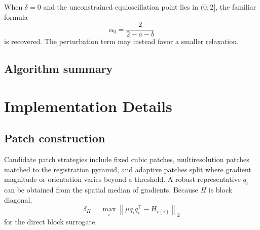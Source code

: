 \documentclass[11pt]{article}
\theoremstyle{definition}
\newcommand{\norm}[1]{\left\lVert #1\right\rVert}
\begin{document}
When $\delta=0$ and the unconstrained equioscillation point lies in $(0,2]$, the familiar formula
\[
\alpha_0=\frac{2}{2-a-b}
\]
is recovered. The perturbation term may instead favor a smaller relaxation.

\subsection{Algorithm summary}
\begin{center}
\end{center}

\section{Implementation Details}
\subsection{Patch construction}
Candidate patch strategies include fixed cubic patches, multiresolution patches matched to the registration pyramid, and adaptive patches split where gradient magnitude or orientation varies beyond a threshold. A robust representative $\bar q_r$ can be obtained from the spatial median of gradients. Because $H$ is block diagonal,
\[
\delta_H
=\max_i\norm{\mu q_iq_i^\top-H_{r(i)}}_2
\]
for the direct block surrogate.
\end{document}
